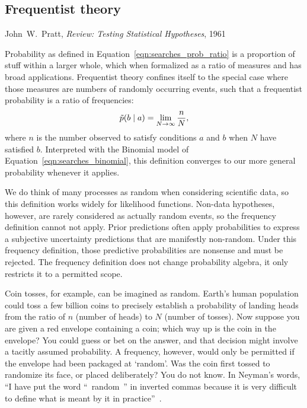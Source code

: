 \begin{singlespacing}
\section{Frequentist theory}
\label{sec:searches_frequentist}
\begin{epigraphs}
%
{John~W.~Pratt,
\textit{Review: Testing Statistical Hypotheses},
1961~\cite{pratt1961testing}}
\end{epigraphs}
\end{singlespacing}

Probability as defined in Equation~\ref{eqn:searches_prob_ratio} is a
proportion of stuff within a larger whole, which when formalized as a ratio
of measures and has broad applications.
Frequentist theory confines itself to the special case where those measures
are numbers of randomly occurring events, such that a frequentist
probability is a ratio of frequencies:
\begin{equation}
\label{eqn:searches_prob_frequency_ratio}
\tilde{p}(b\mid a) = \lim_{N \to \infty}\frac{n}{N},
\end{equation}
where $n$ is the number observed to satisfy conditions $a$ and $b$ when
$N$ have satisfied $b$.
Interpreted with the Binomial model of
Equation~\ref{eqn:searches_binomial}, this definition converges to our more
general probability whenever it applies.

We do think of many processes as random when considering scientific data, so
this definition works widely for likelihood functions.
Non-data hypotheses, however, are rarely considered as actually random events,
so the frequency definition cannot not apply.
Prior predictions often apply probabilities to express a subjective uncertainty
predictions that are manifestly non-random.
Under this frequency definition, those predictive probabilities are nonsense
and must be rejected.
The frequency definition does not change probability algebra, it only restricts
it to a permitted scope.

Coin tosses, for example, can be imagined as random.
Earth's human population could toss a few billion coins to precisely
establish a probability of landing heads from the ratio of
$n$ (number of heads) to $N$ (number of tosses).
Now suppose you are given a red envelope containing a coin;
which way up is the coin in the envelope?
You could guess or bet on the answer, and that decision might involve a tacitly
assumed probability.
A frequency, however, would only be permitted if the envelope had been packaged
at `random'.
Was the coin first tossed to randomize its face, or placed deliberately?
You do not know.
In Neyman's words,
``I have put the word ``~random~'' in inverted commas because it is very
difficult to define what is meant by it in practice''~\cite{
Neyman1937Outline
}.

